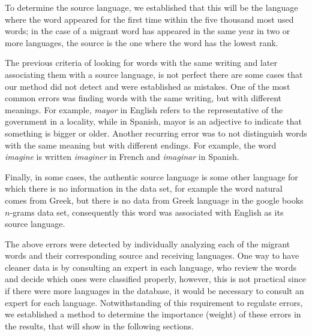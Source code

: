 \documentclass[10pt,letterpaper]{article} %
\begin{document}
To determine the source language, we established that this will be the language where the word appeared for the first time within the five thousand most used words; in the case of a migrant word has appeared in the same year in two or more languages, the source is the one where the word has the lowest rank.




The previous criteria of looking for words with the same writing and later
associating them with a source language, is not perfect there are some cases that our method did not detect and were established as mistakes. One of the most common errors was finding words with the same writing, but with different meanings. For example,  \textit{mayor} in English refers to the representative of the government in a locality, while in Spanish,  mayor is an adjective to indicate that something
is bigger or older.  Another recurring error was to not distinguish words with the same meaning but with different endings. For example, the word \textit{imagine} is written \textit{imaginer} in French and \textit{imaginar} in Spanish.

 Finally, in some cases, the authentic source language is some other language for which there is no information in the data set, for example the word  natural comes from Greek, but there is no data from Greek language in the google books $n$-grams data set, consequently this word was associated with English as its source language.

The above errors were detected by individually analyzing each of the migrant words and their corresponding source and receiving languages. One way to have cleaner data is by consulting an expert in each language, who review the words and decide which ones were classified properly, however, this is not practical since if there were more languages in the database, it would be necessary to consult an expert for each language. Notwithstanding of this requirement to  regulate errors, we established a method to determine the importance (weight) of these errors in the results, that will show in the following sections. 

\end{document}

